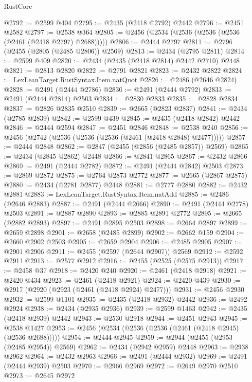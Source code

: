 \begin{lexlean}{RustCore}
\begin{coremodule}
@2792 := @2599 @404
@2795 := @2435 (@2418 @2792) @2442
@2796 := @2451 @2582
@2797 := @2538 @364
@2805 := @2456 (@2534 (@2536 (@2536 (@2536 (@2461 (@2418 @2797) @2688)))))
@2806 := @2444 @2797
@2811 := @2796 (@2455 (@2805 (@2485 @2806)) @2569)
@2813 := @2434 (@2795 @2811)
@2814 := @2599 @409
@2820 := @2434 (@2435 (@2418 @2814) @2442 @2710) @2448
@2821 := @2813 @2820
@2822 := @2791 @2821
@2823 := @2432 @2822
@2824 := LexLeanTarget.RustSyntax.Item.natQuot
@2826 := @2486 (@2646 @2824)
@2828 := @2491 (@2444 @2786)
@2830 := @2491 (@2444 @2792)
@2833 := @2491 (@2444 @2814) @2503
@2834 := @2830 @2833
@2835 := @2828 @2834
@2837 := @2826 @2835 @2510
@2839 := @2665 (@2823 @2837)
@2841 := @2434 (@2785 @2839)
@2842 := @2599 @439
@2845 := @2435 (@2418 @2842) @2442
@2846 := @2444 @2594
@2847 := @2451 @2846
@2848 := @2538 @240
@2856 := @2456 (@2742 (@2536 (@2536 (@2536 (@2461 (@2418 @2848) @2477)))))
@2857 := @2444 @2848
@2862 := @2847 (@2455 (@2856 (@2485 @2857)) @2569)
@2865 := @2434 (@2845 @2862) @2448
@2866 := @2841 @2865
@2867 := @2432 @2866
@2869 := @2491 (@2444 @2782)
@2872 := @2491 (@2444 @2842) @2503
@2873 := @2869 @2872
@2875 := @2764 @2873 @2772
@2877 := @2665 (@2867 @2875)
@2880 := @2434 (@2781 @2877) @2448
@2881 := @2777 @2880
@2882 := @2432 @2881
@2883 := LexLeanTarget.RustSyntax.Item.natAdd
@2885 := @2486 (@2646 @2883)
@2887 := @2491 (@2444 @2666)
@2890 := @2491 (@2444 @2778) @2503
@2891 := @2887 @2890
@2893 := @2885 @2891 @2772
@2895 := @2665 (@2882 @2893)
@2897 := @2491 @2895 @2503
@2898 := @2664 @2897
@2899 := @2659 @2898
@2901 := @2658 (@2485 @2899)
@2902 := @2662 @159
@2904 := @2660 @2902 @2503
@2905 := @2659 @2904
@2906 := @2485 @2905
@2907 := @2901 @2906
@2911 := @2455 (@2597 (@2644 @2907)) @2569
@2912 := @2592 @2911
@2913 := @2577 @2912
@2916 := @2455 (@2525 (@2575 @2913))
@2917 := @2458 @37
@2918 := @2420 @240
@2920 := @2461 (@2418 @2918)
@2921 := @2420 @434
@2923 := @2461 (@2418 @2921)
@2924 := @2420 @439
@2930 := @2917 (@2920 (@2923 (@2461 (@2418 @2924) @2477)))
@2931 := @2456 @2930
@2932 := @2599 @1101
@2935 := @2435 (@2418 @2932) @2442
@2936 := @2492 @2924
@2938 := @2434 (@2935 @2936)
@2939 := @2599 @1463
@2942 := @2435 (@2418 @2939) @2442
@2943 := @2530 @2918
@2944 := @2451 @2943
@2945 := @2538 @1427
@2953 := @2456 (@2534 (@2536 (@2536 (@2461 (@2418 @2945) (@2536 @2688)))))
@2954 := @2444 @2945
@2959 := @2944 (@2455 (@2953 (@2485 @2954)) @2569)
@2962 := @2434 (@2942 @2959) @2448
@2963 := @2938 @2962
@2964 := @2432 @2963
@2966 := @2491 (@2444 @2932)
@2969 := @2491 (@2444 @2939) @2503
@2970 := @2966 @2969
@2972 := @2649 @2970 @2510
@2973 := @2645 @2972

\end{coremodule}
\end{lexlean}
